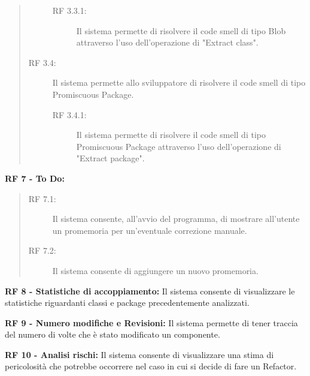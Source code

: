\begin{list}{-}{}
\begin{quote}
\begin{description}
				\begin{description}
					\item[RF 3.3.1:]Il sistema permette di risolvere il code smell di tipo Blob attraverso l'uso dell'operazione di "Extract class".
					\newline		
				\end{description}
					
			\item[RF 3.4:]Il sistema permette allo sviluppatore di risolvere il code smell di tipo Promiscuous Package.
			
				\begin{description}
					\item[RF 3.4.1:]Il sistema permette di risolvere il code smell di tipo Promiscuous Package attraverso l'uso dell'operazione di "Extract package".
					\newline		
				\end{description}
			
		\end{description}
	\end{quote}
	\item \textbf{RF 7 - To Do:} 
	\begin{quote}
	\begin{description}
		\item[RF 7.1:]Il sistema consente, all'avvio del programma, di mostrare all'utente un promemoria per un'eventuale correzione manuale.
	\end{description}
	
		\begin{description}
			\item [RF 7.2: ]Il sistema consente di aggiungere un nuovo promemoria.
		\end{description}	
	\end{quote}
	
	\item	\textbf{RF 8 -  Statistiche di accoppiamento:}
	\newline Il sistema consente di visualizzare le statistiche riguardanti classi e package precedentemente analizzati.
	
	\item	\textbf{RF 9 - Numero modifiche e Revisioni:}
	\newline Il sistema permette di tener traccia del numero di volte che è stato modificato un componente.
	
	\item	\textbf{RF 10 - Analisi rischi:}
	\newline Il sistema consente di visualizzare una stima di pericolosità che potrebbe occorrere nel caso in cui si decide di fare un Refactor.
\end{list}		

